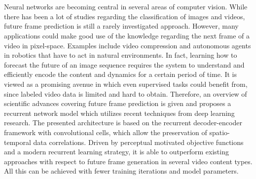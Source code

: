 \chapter{\abstractname}

Neural networks are becoming central in several areas of computer vision. While there has been a lot of studies regarding the classification of images and videos, future frame prediction is still a rarely investigated approach. However, many applications could make good use of the knowledge regarding the next frame of a video in pixel-space. Examples include video compression and autonomous agents in robotics that have to act in natural environments. In fact, learning how to forecast the future of an image sequence requires the system to understand and efficiently encode the content and dynamics for a certain period of time. It is viewed as a promising avenue in which even supervised tasks could benefit from, since labeled video data is limited and hard to obtain. Therefore, an overview of scientific advances covering future frame prediction is given and proposes a recurrent network model which utilizes recent techniques from deep learning research. The presented architecture is based on the recurrent decoder-encoder framework with convolutional cells, which allow the preservation of spatio-temporal data correlations. Driven by perceptual motivated objective functions and a modern recurrent learning strategy, it is able to outperform existing approaches with respect to future frame generation in several video content types. All this can be achieved with fewer training iterations and model parameters.



